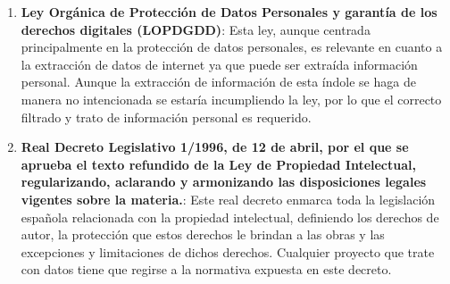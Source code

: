 \begin{enumerate}
    \item \textbf{Ley Orgánica de Protección de Datos Personales y garantía de
    los derechos digitales (LOPDGDD)}: Esta ley, aunque centrada principalmente
    en la protección de datos personales, es relevante en cuanto a la extracción
    de datos de internet ya que puede ser extraída información personal. Aunque
    la extracción de información de esta índole se haga de manera no
    intencionada se estaría incumpliendo la ley, por lo que el correcto filtrado
    y trato de información personal es requerido.\cite{BOE1}

    \item \textbf{Real Decreto Legislativo 1/1996, de 12 de abril, por el que se
    aprueba el texto refundido de la Ley de Propiedad Intelectual,
    regularizando, aclarando y armonizando las disposiciones legales vigentes
    sobre la materia.}: Este real decreto enmarca toda la legislación española
    relacionada con la propiedad intelectual, definiendo los derechos de autor,
    la protección que estos derechos le brindan a las obras y las excepciones y
    limitaciones de dichos derechos. Cualquier proyecto que trate con datos
    tiene que regirse a la normativa expuesta en este
    decreto.\cite{BOE2}


\end{enumerate}
